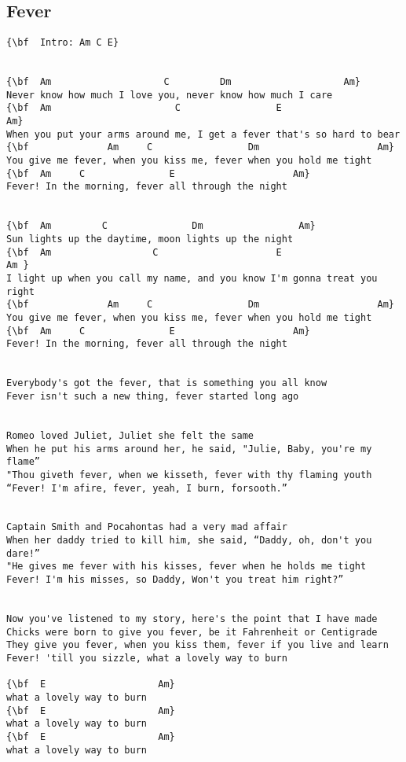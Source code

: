 \documentclass[a4paper]{article}
\begin{document}
\subsection{Fever}
\begin{Verbatim}[commandchars=\\\{\}]
{\bf  Intro: Am C E}


{\bf  Am                    C         Dm                    Am}
Never know how much I love you, never know how much I care
{\bf  Am                      C                 E                       Am}
When you put your arms around me, I get a fever that's so hard to bear
{\bf              Am     C                 Dm                     Am}
You give me fever, when you kiss me, fever when you hold me tight
{\bf  Am     C               E                     Am}
Fever! In the morning, fever all through the night


{\bf  Am         C               Dm                 Am}
Sun lights up the daytime, moon lights up the night
{\bf  Am                  C                     E                        Am }
I light up when you call my name, and you know I'm gonna treat you right
{\bf              Am     C                 Dm                     Am}
You give me fever, when you kiss me, fever when you hold me tight
{\bf  Am     C               E                     Am}
Fever! In the morning, fever all through the night


Everybody's got the fever, that is something you all know
Fever isn't such a new thing, fever started long ago


Romeo loved Juliet, Juliet she felt the same
When he put his arms around her, he said, "Julie, Baby, you're my flame”
"Thou giveth fever, when we kisseth, fever with thy flaming youth
“Fever! I'm afire, fever, yeah, I burn, forsooth.”


Captain Smith and Pocahontas had a very mad affair
When her daddy tried to kill him, she said, “Daddy, oh, don't you dare!”
"He gives me fever with his kisses, fever when he holds me tight
Fever! I'm his misses, so Daddy, Won't you treat him right?”


Now you've listened to my story, here's the point that I have made
Chicks were born to give you fever, be it Fahrenheit or Centigrade
They give you fever, when you kiss them, fever if you live and learn
Fever! 'till you sizzle, what a lovely way to burn

{\bf  E                    Am}
what a lovely way to burn
{\bf  E                    Am}
what a lovely way to burn
{\bf  E                    Am}
what a lovely way to burn

\end{Verbatim}
\newpage
\end{document}
